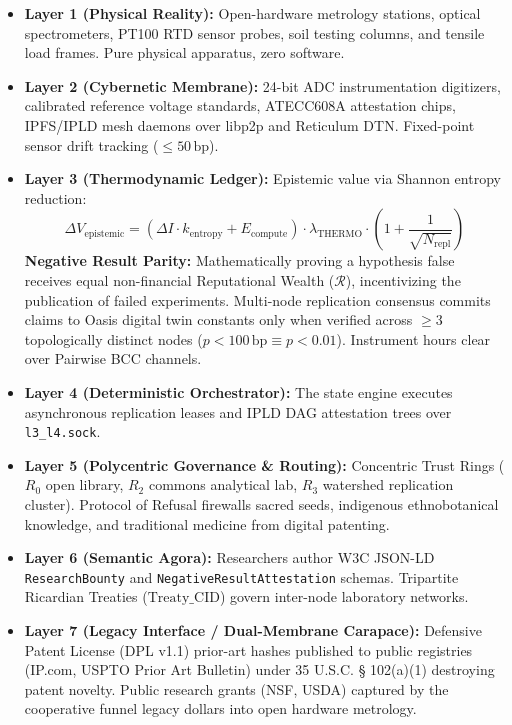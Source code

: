 \begin{itemize}
    \item \textbf{Layer 1 (Physical Reality):} Open-hardware metrology stations, optical spectrometers, PT100 RTD sensor probes, soil testing columns, and tensile load frames. Pure physical apparatus, zero software.
    \item \textbf{Layer 2 (Cybernetic Membrane):} 24-bit ADC instrumentation digitizers, calibrated reference voltage standards, ATECC608A attestation chips, IPFS/IPLD mesh daemons over libp2p and Reticulum DTN. Fixed-point sensor drift tracking ($\le 50\,\mathrm{bp}$).
    \item \textbf{Layer 3 (Thermodynamic Ledger):} Epistemic value via Shannon entropy reduction:
    \[
    \Delta V_{\mathrm{epistemic}} = \left( \Delta I \cdot k_{\mathrm{entropy}} + E_{\mathrm{compute}} \right) \cdot \lambda_{\mathrm{THERMO}} \cdot \left(1 + \frac{1}{\sqrt{N_{\mathrm{repl}}}}\right)
    \]
    \textbf{Negative Result Parity:} Mathematically proving a hypothesis false receives equal non-financial Reputational Wealth ($\mathcal{R}$), incentivizing the publication of failed experiments. Multi-node replication consensus commits claims to Oasis digital twin constants only when verified across $\ge 3$ topologically distinct nodes ($p < 100\,\mathrm{bp} \equiv p < 0.01$). Instrument hours clear over Pairwise BCC channels.
    \item \textbf{Layer 4 (Deterministic Orchestrator):} The state engine executes asynchronous replication leases and IPLD DAG attestation trees over \texttt{l3\_l4.sock}.
    \item \textbf{Layer 5 (Polycentric Governance \& Routing):} Concentric Trust Rings ($R_0$ open library, $R_2$ commons analytical lab, $R_3$ watershed replication cluster). Protocol of Refusal firewalls sacred seeds, indigenous ethnobotanical knowledge, and traditional medicine from digital patenting.
    \item \textbf{Layer 6 (Semantic Agora):} Researchers author W3C JSON-LD \texttt{ResearchBounty} and \texttt{NegativeResultAttestation} schemas. Tripartite Ricardian Treaties ($\mathrm{Treaty\_CID}$) govern inter-node laboratory networks.
    \item \textbf{Layer 7 (Legacy Interface / Dual-Membrane Carapace):} Defensive Patent License (DPL v1.1) prior-art hashes published to public registries (IP.com, USPTO Prior Art Bulletin) under 35 U.S.C. § 102(a)(1) destroying patent novelty. Public research grants (NSF, USDA) captured by the cooperative funnel legacy dollars into open hardware metrology.
\end{itemize}


